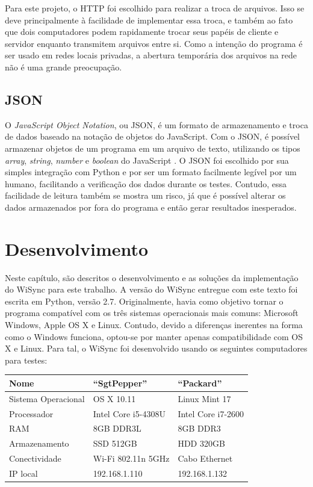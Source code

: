 \documentclass[12pt,a4paper]{ufpr}
\begin{document}
Para este projeto, o HTTP foi escolhido para realizar a troca de arquivos.
Isso se deve principalmente à facilidade de implementar essa troca, e também ao fato que dois computadores podem rapidamente trocar seus papéis de cliente e servidor enquanto transmitem arquivos entre si.
Como a intenção do programa é ser usado em redes locais privadas, a abertura temporária dos arquivos na rede não é uma grande preocupação.

\section {JSON}
O \textit{JavaScript Object Notation}, ou JSON, é um formato de armazenamento e troca de dados baseado na notação de objetos do JavaScript. Com o JSON, é possível armazenar objetos de um programa em um arquivo de texto, utilizando os tipos \textit{array}, \textit{string}, \textit{number} e \textit{boolean} do JavaScript \cite{json}.
O JSON foi escolhido por sua simples integração com Python e por ser um formato facilmente legível por um humano, facilitando a verificação dos dados durante os testes.
Contudo, essa facilidade de leitura também se mostra um risco, já que é possível alterar os dados armazenados por fora do programa e então gerar resultados inesperados.


\chapter{Desenvolvimento}
\label{desenvolvimento}
Neste capítulo, são descritos o desenvolvimento e as soluções da implementação do WiSync para este trabalho.
A versão do WiSync entregue com este texto foi escrita em Python, versão 2.7.
Originalmente, havia como objetivo tornar o programa compatível com os três sistemas operacionais mais comuns: Microsoft Windows, Apple OS X e Linux.
Contudo, devido a diferenças inerentes na forma como o Windows funciona, optou-se por manter apenas compatibilidade com OS X e Linux.
Para tal, o WiSync foi desenvolvido usando os seguintes computadores para testes:

\begin{center}
  \begin{tabular}{ l | l | l }
    \hline
    \textbf{Nome} & ``SgtPepper'' & ``Packard'' \\ \hline \hline
    Sistema Operacional & OS X 10.11 & Linux Mint 17 \\ \hline
    Processador & Intel Core i5-4308U & Intel Core i7-2600 \\ \hline
    RAM & 8GB DDR3L & 8GB DDR3 \\ \hline

    
    Armazenamento & SSD 512GB & HDD 320GB \\ \hline
    Conectividade & Wi-Fi 802.11n 5GHz & Cabo Ethernet \\ \hline
    IP local & 192.168.1.110 & 192.168.1.132 \\
    \hline
  \end{tabular}
\end{center}
\end{document}
